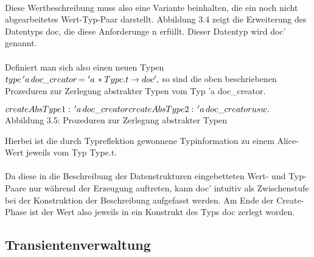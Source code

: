 \documentclass[12pt,a4paper]{article}
\begin{document}
\paragraph{}

Diese Wertbeschreibung muss also eine Variante 
beinhalten, die ein noch nicht abgearbeitetes 
Wert-Typ-Paar darstellt. Abbildung 3.4 zeigt die 
Erweiterung des Datentyps doc, die diese 
Anforderunge n erf\"ullt. Dieser Datentyp 
wird doc' genannt.

\paragraph{}

Definiert man sich also einen neuen Typen \newline
\begin{math}
type \, 'a \, doc\_creator \, $=$ \, \,'a \, * Type.t \rightarrow doc',
\end{math} \newline
so sind die oben beschriebenen Prozeduren zur 
Zerlegung abstrakter Typen vom Typ 'a doc\_creator. 
\begin{center}
\begin{math}
createAbsType1: \, 'a \, doc\_creator \newline
createAbsType2: \, 'a \, doc\_creator \newline 
usw. \newline
\end{math} \nopagebreak \newline \nopagebreak
Abbildung 3.5: Prozeduren zur Zerlegung abstrakter Typen
\end{center}
Hierbei ist die durch Typreflektion gewonnene Typinformation 
zu einem Alice-Wert jeweils vom Typ Type.t.
 
\paragraph{}

Da diese in die Beschreibung der Datenstrukturen   
eingebetteten Wert- und Typ-Paare nur w\"ahrend der Erzeugung 
auftreten, kann doc' intuitiv als Zwischenstufe bei der 
Konstruktion der Beschreibung aufgefasst werden. Am Ende der 
Create-Phase ist der Wert also jeweils in ein Konstrukt des Typs doc
zerlegt worden.

\subsection{Transientenverwaltung}
\end{document}
